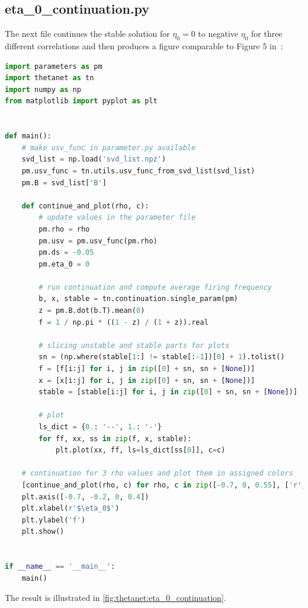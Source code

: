 \documentclass[bibliography=totoc, twoside]{article}
\numberwithin{equation}{section}
\begin{document}
\subsection*{eta\_0\_continuation.py}
The next file continues the stable solution for $\eta_0=0$ to negative $\eta_0$ for three different correlations and then produces a figure comparable to Figure 5 in~\cite{Laing2019}:
\begin{lstlisting}[language=python]
import parameters as pm
import thetanet as tn
import numpy as np
from matplotlib import pyplot as plt


def main():
    # make usv_func in parameter.py available
    svd_list = np.load('svd_list.npz')
    pm.usv_func = tn.utils.usv_func_from_svd_list(svd_list)
    pm.B = svd_list['B']

    def continue_and_plot(rho, c):
        # update values in the parameter file
        pm.rho = rho
        pm.usv = pm.usv_func(pm.rho)
        pm.ds = -0.05
        pm.eta_0 = 0

        # run continuation and compute average firing frequency
        b, x, stable = tn.continuation.single_param(pm)
        z = pm.B.dot(b.T).mean(0)
        f = 1 / np.pi * ((1 - z) / (1 + z)).real

        # slicing unstable and stable parts for plots
        sn = (np.where(stable[1:] != stable[:-1])[0] + 1).tolist()
        f = [f[i:j] for i, j in zip([0] + sn, sn + [None])]
        x = [x[i:j] for i, j in zip([0] + sn, sn + [None])]
        stable = [stable[i:j] for i, j in zip([0] + sn, sn + [None])]

        # plot
        ls_dict = {0.: '--', 1.: '-'}
        for ff, xx, ss in zip(f, x, stable):
            plt.plot(xx, ff, ls=ls_dict[ss[0]], c=c)

    # continuation for 3 rho values and plot them in assigned colors
    [continue_and_plot(rho, c) for rho, c in zip([-0.7, 0, 0.55], ['r', 'k', 'b'])]
    plt.axis([-0.7, -0.2, 0, 0.4])
    plt.xlabel(r'$\eta_0$')
    plt.ylabel('f')
    plt.show()


if __name__ == '__main__':
    main()
\end{lstlisting}
The result is illustrated in \autoref{fig:thetanet:eta_0_continuation}.
\end{document}
